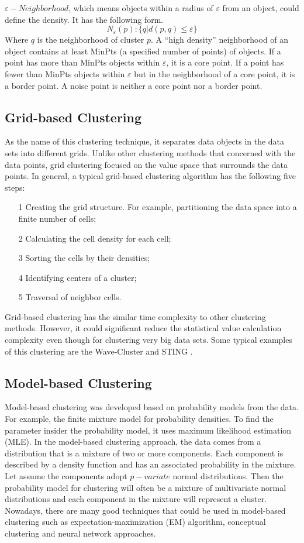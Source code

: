 \documentclass[sigconf]{acmart}
\begin{document}
$\varepsilon-Neighborhood$, which means objects within a radius of $\varepsilon$ from an object, could define the density. It has the following form.
\[N_{\varepsilon}(p):\{q \vert d(p,q)\leq \varepsilon\}\]
Where $q$ is the neighborhood of cluster $p$. A ``high density'' neighborhood of an object contains at least MinPts (a specified number of points) of objects. If a point has more than MinPts objects within $\varepsilon$, it is a core point. If a point has fewer than MinPts objects within $\varepsilon$ but in the neighborhood of a core point, it is a border point. A noise point is neither a core point nor a border point.

\subsection{Grid-based Clustering}

As the name of this clustering technique, it separates data objects in the data sets into different grids. Unlike other clustering methods that concerned with the data points, grid clustering focused on the value space that surrounds the data points. In general, a typical grid-based clustering algorithm has the following five steps:
\begin{itemize}
\item[1] Creating the grid structure. For example, partitioning the data space into a finite number of cells;
\item[2] Calculating the cell density for each cell;
\item[3] Sorting the cells by their densities;
\item[4] Identifying centers of a cluster;
\item[5] Traversal of neighbor cells.
\end{itemize}

Grid-based clustering has the similar time complexity to other clustering methods. However, it could significant reduce the statistical value calculation complexity even though for clustering very big data sets. Some typical examples of this clustering are the Wave-Cluster and STING \cite{dcar}.

\subsection{Model-based Clustering}

Model-based clustering was developed based on probability models from the data. For example, the finite mixture model for probability densities. To find the parameter insider the probability model, it uses maximum likelihood estimation (MLE). In the model-based clustering approach, the data comes from a distribution that is a mixture of two or more components. Each component is described by a density function and has an associated probability in the mixture. Let assume the components adopt $p-variate$ normal distributions. Then the probability model for clustering will often be a mixture of multivariate normal distributions and each component in the mixture will represent a cluster. Nowadays, there are many good techniques that could be used in model-based clustering such as expectation-maximization (EM) algorithm, conceptual clustering and neural network approaches.
\end{document}
